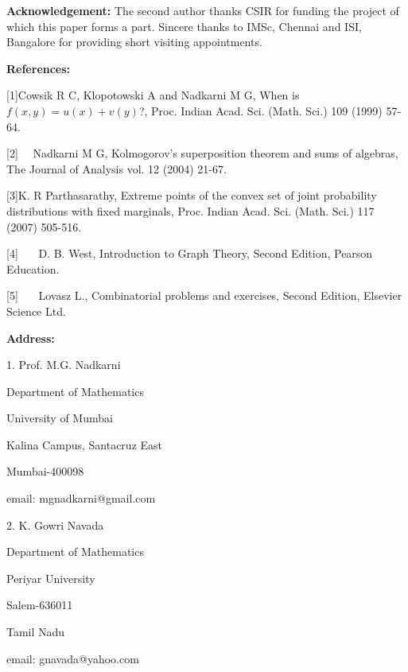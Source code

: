 \documentclass{article}
\begin{document}
\bigskip

{\large \textbf{Acknowledgement:} The second author thanks CSIR for funding
the project of which this paper forms a part. Sincere thanks to IMSc,
Chennai and ISI, Bangalore for providing short visiting appointments.}

{\large \bigskip }

{\large \textbf{References:} }

{\large \medskip }

{\large [1]\quad Cowsik R C, Klopotowski A and Nadkarni M G, When is $%
f(x,y)=u(x)+v(y)$?, Proc. Indian Acad. Sci. (Math. Sci.) 109 (1999) 57-64. }

{\large [2] \ \ Nadkarni M G, Kolmogorov's superposition theorem and sums of
algebras, The Journal of Analysis vol. 12 (2004) 21-67. }

{\large [3]\quad K. R Parthasarathy, Extreme points of the convex set of
joint probability distributions with fixed marginals, Proc. Indian Acad.
Sci. (Math. Sci.) 117 (2007) 505-516. }

{\large [4] \ \ \ D. B. West, Introduction to Graph Theory, Second Edition,
Pearson Education. }

{\large [5] \ \ \ Lovasz L., Combinatorial problems and exercises, Second
Edition, Elsevier Science Ltd. }

{\large \bigskip }

{\large \textbf{Address:} }

{\large \medskip }

{\large 1. Prof. M.G. Nadkarni }

{\large Department of Mathematics }

{\large University of Mumbai }

{\large Kalina Campus, Santacruz East }

{\large Mumbai-400098 }

{\large email: mgnadkarni@gmail.com }

{\large \bigskip }

{\large 2. K. Gowri Navada }

{\large Department of Mathematics }

{\large Periyar University }

{\large Salem-636011 }

{\large Tamil Nadu }

{\large email: gnavada@yahoo.com }

{\large \bigskip }
\end{document}
